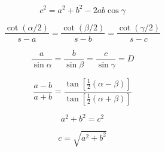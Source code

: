 






\[\begin{equation} c^2 = a^2 + b^2 - 2 a b\cos\gamma \end{equation}\]

\[\begin{equation} \frac{\cot(\alpha / 2)}{s - a} = \frac{\cot(\beta / 2)}{s - b} = \frac{\cot(\gamma / 2)}{s - c} \end{equation}\]

\[\begin{equation} \frac{a}{\sin \alpha} = \frac{b}{\sin \beta} = \frac{c}{\sin \gamma} = D \end{equation}\]

\[\begin{equation} \frac{a - b}{a + b} = \frac{\tan\left[ \frac{1}{2} (\alpha - \beta) \right]}{\tan \left[ \frac{1}{2} (\alpha + \beta) \right]} \end{equation}\]

\[\begin{equation} a^2 + b^2 = c^2\! \end{equation}\]

\[\begin{equation} c = \sqrt{a^2 + b^2} \end{equation}\]
